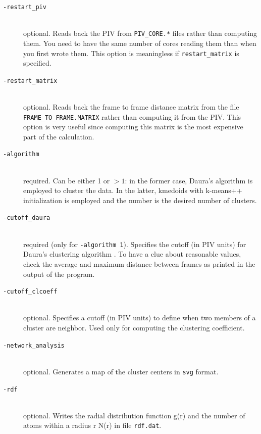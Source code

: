 \documentclass[a4paper,11pt]{article}
\begin{document}
\begin{description}
  \item[\texttt{-restart\_piv} ]\hfill\\
                                       {\color{green}optional}. Reads back the PIV from \texttt{PIV\_CORE.*}
                                       files rather than computing them. You need to have the same number of cores
                                       reading them than when you first wrote them. This option is meaningless 
                                       if \texttt{restart\_matrix} is specified.
  \item[\texttt{-restart\_matrix}   ]\hfill\\
                                       {\color{green}optional}. 
                                       Reads back the frame to frame
                                       distance matrix from the file \texttt{FRAME\_TO\_FRAME.MATRIX} rather than
                                       computing it from the PIV. This option is very useful since computing
                                       this matrix is the most expensive part of the calculation.
  \item[\texttt{-algorithm}         ]\hfill\\
                                       {\color{red}required}. Can be either 1 or $>1$: in the former case, Daura's algorithm
                                       \cite{daura} is employed to cluster the data. In the latter, kmedoids \cite{kmedoids}
                                       with k-means++ initialization \cite{kmeans} is employed and the number
                                       is the desired number of clusters.
  \item[\texttt{-cutoff\_daura}     ]\hfill\\
                                       {\color{red}required} (only for \texttt{-algorithm 1}). Specifies the cutoff (in PIV units) for Daura's 
                                       clustering algorithm \cite{daura}. To have a clue about reasonable values, check the average and maximum
                                       distance between frames as printed in the output of the program.
  \item[\texttt{-cutoff\_clcoeff}   ]\hfill\\
                                       {\color{green}optional}. Specifies a cutoff (in PIV units) to define when two members of a cluster are
                                       neighbor. Used only for computing the clustering coefficient.
  \item[\texttt{-network\_analysis} ]\hfill\\
                                       {\color{green}optional}. Generates a map of the cluster centers in \texttt{svg} format.
  \item[\texttt{-rdf}               ]\hfill\\
                                       {\color{green}optional}. Writes the radial distribution function g(r) and the number of atoms
                                        within a radius r N(r) in file \texttt{rdf.dat}.
  \end{description}
\end{document}
